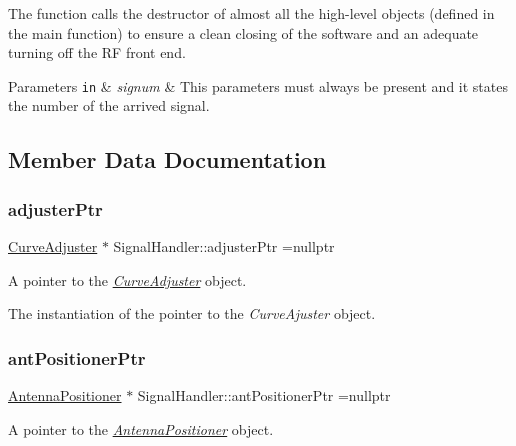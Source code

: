 The function calls the destructor of almost all the high-\/level objects (defined in the main function) to ensure a clean closing of the software and an adequate turning off the RF front end. 
\begin{DoxyParams}[1]{Parameters}
\mbox{\tt in}  & {\em signum} & This parameters must always be present and it states the number of the arrived signal. \\
\hline
\end{DoxyParams}


\subsection{Member Data Documentation}
\mbox{\label{classSignalHandler_ab3328bb82a0e67153d8ff39bf04c7196}} 
\subsubsection{\texorpdfstring{adjuster\+Ptr}{adjusterPtr}}
{\footnotesize\ttfamily \hyperlink{classCurveAdjuster}{Curve\+Adjuster} $\ast$ Signal\+Handler\+::adjuster\+Ptr =nullptr\hspace{0.3cm}{\ttfamily [static]}}



A pointer to the {\itshape \hyperlink{classCurveAdjuster}{Curve\+Adjuster}} object. 

The instantiation of the pointer to the {\itshape Curve\+Ajuster} object. \mbox{\label{classSignalHandler_a04f82481d0f5795308e6e2cef7bb0f88}} 
\subsubsection{\texorpdfstring{ant\+Positioner\+Ptr}{antPositionerPtr}}
{\footnotesize\ttfamily \hyperlink{classAntennaPositioner}{Antenna\+Positioner} $\ast$ Signal\+Handler\+::ant\+Positioner\+Ptr =nullptr\hspace{0.3cm}{\ttfamily [static]}}



A pointer to the {\itshape \hyperlink{classAntennaPositioner}{Antenna\+Positioner}} object. 

